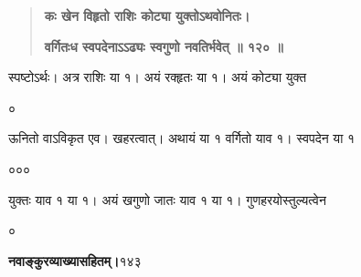 \documentclass[11pt, openany]{book}
\begin{document}
\begin{sloppypar}
\begin{quote}
\hspace{1in}\textbf{कः खेन विहृतो राशिः कोट्या युक्तोऽथवोनितः।}

\hspace{1in}\textbf{वर्गितःध स्वपदेनाऽऽढ्यः स्वगुणो नवतिर्भवेत् ॥ १२० ॥}
\end{quote}

\hangindent=0.2in \hspace{0.2in}स्पष्टोऽर्थः। अत्र राशिः या १। अयं रक्हृतः या १। अयं कोट्या युक्त

\hspace{3.1in}०

\hangindent=0.2in \hspace{0.2in}ऊनितो वाऽविकृत एव। खहरत्वात्। अथायं या १ वर्गितो याव १। स्वपदेन या १

\hspace{3.1in}०\hspace{0.85in}०\hspace{0.85in}०

\hangindent=0.2in \hspace{0.2in}युक्तः याव १ या १। अयं खगुणो जातः याव १ या १। गुणहरयोस्तुल्यत्वेन

\hspace{1.25in}०
\end{sloppypar}
\thispagestyle{empty}
\newpage

\onehalfspacing
\hspace{2in}\textbf{नवाङ्कुरव्याख्यासहितम्।}\hspace{2in}१४३

\vspace{5mm}
\end{document}

